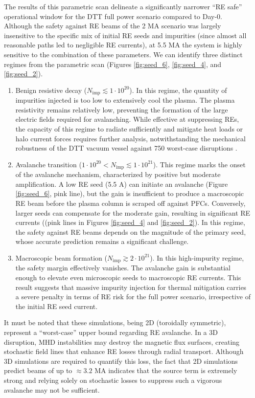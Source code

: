\documentclass[aip,reprint]{revtex4-1}
\begin{document}
The results of this parametric scan delineate a significantly narrower ``RE safe'' operational window for the DTT full power scenario compared to Day-0. Although the safety against RE beams of the 2 MA scenario was largely insensitive to the specific mix of initial RE seeds and impurities (since almost all reasonable paths led to negligible RE currents), at 5.5 MA the system is highly sensitive to the combination of these parameters. 
We can identify three distinct regimes from the parametric scan (Figures \ref{fig:seed_6}, \ref{fig:seed_4}, and \ref{fig:seed_2}).
\begin{enumerate}
    \item Benign resistive decay ($N_\text{imp} \lesssim 1\cdot10^{20}$). In this regime, the quantity of impurities injected is too low to extensively cool the plasma. The plasma resistivity remains relatively low, preventing the formation of the large electric fields required for avalanching. While effective at suppressing REs, the capacity of this regime to radiate sufficiently and mitigate heat loads or halo current forces requires further analysis, notwithstanding the mechanical robustness of the DTT vacuum vessel against 750 worst-case disruptions \cite{Romanelli2024}.
    \item Avalanche transition ($1\cdot10^{20} < N_\text{imp} \lesssim 1\cdot10^{21}$). This regime marks the onset of the avalanche mechanism, characterized by positive but moderate amplification. A low RE seed (5.5 A) can initiate an avalanche (Figure \ref{fig:seed_6}, pink line), but the gain is insufficient to produce a macroscopic RE beam before the plasma column is scraped off against PFCs. Conversely, larger seeds can compensate for the moderate gain, resulting in significant RE currents ((pink lines in Figures \ref{fig:seed_4} and \ref{fig:seed_2}). In this regime, the safety against RE beams depends on the magnitude of the primary seed, whose accurate prediction remains a significant challenge.
    \item Macroscopic beam formation ($N_\text{imp} \gtrsim 2\cdot10^{21}$). In this high-impurity regime, the safety margin effectively vanishes. The avalanche gain is substantial enough to elevate even microscopic seeds to macroscopic RE currents. This result suggests that massive impurity injection for thermal mitigation carries a severe penalty in terms of RE risk for the full power scenario, irrespective of the initial RE seed current.
\end{enumerate}
It must be noted that these simulations, being 2D (toroidally symmetric), represent a ``worst-case'' upper bound regarding RE avalanche. In a 3D disruption, MHD instabilities may destroy the magnetic flux surfaces, creating stochastic field lines that enhance RE losses through radial transport. Although 3D simulations are required to quantify this loss, the fact that 2D simulations predict beams of up to $\approx 3.2$ MA indicates that the source term is extremely strong and relying solely on stochastic losses to suppress such a vigorous avalanche may not be sufficient.
\end{document}
